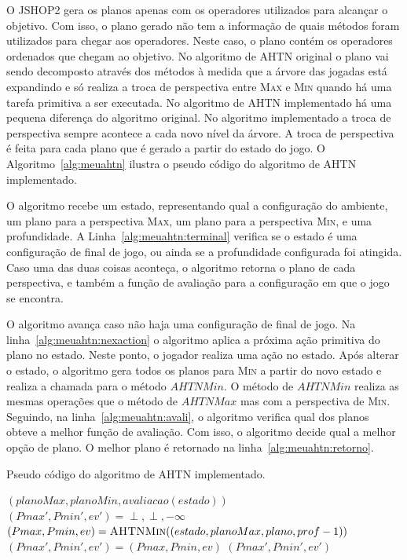 O JSHOP2 gera os planos apenas com os operadores utilizados para alcançar o objetivo.
Com isso, o plano gerado não tem a informação de quais métodos foram utilizados para chegar aos operadores.
Neste caso, o plano contém os operadores ordenados que chegam ao objetivo.
No algoritmo de AHTN original o plano vai sendo decomposto através dos métodos à medida que a árvore das jogadas está expandindo e só realiza a troca de perspectiva entre \textsc{Max} e \textsc{Min} quando há uma tarefa primitiva a ser executada.
No algoritmo de AHTN implementado há uma pequena diferença do algoritmo original.
No algoritmo implementado a troca de perspectiva sempre acontece a cada novo nível da árvore.
A troca de perspectiva é feita para cada plano que é gerado a partir do estado do jogo.
O Algoritmo~\ref{alg:meuahtn} ilustra o pseudo código do algoritmo de AHTN implementado.

O algoritmo recebe um estado, representando qual a configuração do ambiente, um plano para a perspectiva \textsc{Max}, um plano para a perspectiva \textsc{Min}, e uma profundidade.
A Linha~\ref{alg:meuahtn:terminal} verifica se o estado é uma configuração de final de jogo, ou ainda se a profundidade configurada foi atingida.
Caso uma das duas coisas aconteça, o algoritmo retorna o plano de cada perspectiva, e também a função de avaliação para a configuração em que o jogo se encontra.

O algoritmo avança caso não haja uma configuração de final de jogo.
Na linha~\ref{alg:meuahtn:nexaction} o algoritmo aplica a próxima ação primitiva do plano no estado.
Neste ponto, o jogador realiza uma ação no estado.
Após alterar o estado, o algoritmo gera todos os planos para \textsc{Min} a partir do novo estado e realiza a chamada para o método $\mathit{AHTNMin}$.
O método de $\mathit{AHTNMin}$ realiza as mesmas operações que o método de $\mathit{AHTNMax}$ mas com a perspectiva de \textsc{Min}.
Seguindo, na linha~\ref{alg:meuahtn:avali}, o algoritmo verifica qual dos planos obteve a melhor função de avaliação. 
Com isso, o algoritmo decide qual a melhor opção de plano.
O melhor plano é retornado na linha~\ref{alg:meuahtn:retorno}.


\begin{algorithm}[ht]
	\caption{Pseudo código do algoritmo de AHTN implementado.}
	\label{alg:meuahtn}
 	\begin{algorithmic}[1]		
	 		 \label{alg:meuahtn:terminal}
		 		\State	\Return $(planoMax, planoMin, avaliacao(estado))$
	 		\EndIf
	 		 \label{alg:meuahtn:nexaction}
	 		\State $(Pmax', Pmin', ev') = \perp, \perp, -\infty$
			 \label{alg:meuahtn:for}
		 		\State $(Pmax, Pmin, ev) = \Call{AHTNMin}{(estado, planoMax, plano, prof-1)}$ \label{alg:meuahtn:ahtnmin}
			 	 \label{alg:meuahtn:avali}
					\State $(Pmax', Pmin', ev') = (Pmax, Pmin, ev)$
				\EndIf		 		 		
		 	\EndFor
		 	\State \Return $(Pmax', Pmin', ev')$ \label{alg:meuahtn:retorno}
 		\EndFunction
 	\end{algorithmic}
 \end{algorithm}
 

